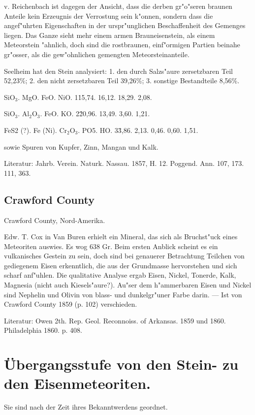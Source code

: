 \documentclass[a4paper, 11pt, oneside]{article}
\begin{document}
v. Reichenbach ist dagegen der Ansicht, dass die derben gr"o"seren braunen Anteile kein Erzeugnis der Verrostung sein k"onnen, sondern dass die angef"uhrten Eigenschaften in der urspr"unglichen Beschaffenheit des Gemenges liegen. Das Ganze sieht mehr einem armen Brauneisenstein, als einem Meteorstein "ahnlich, doch sind die rostbraunen, einf"ormigen Partien beinahe gr"osser, als die gew"ohnlichen gemengten Meteorsteinanteile.

Seelheim hat den Stein analysiert: 1. den durch Salzs"aure zersetzbaren Teil 52,23\%; 2. den nicht zersetzbaren Teil 39,26\%; 3. sonstige Bestandteile 8,56\%.

SiO$_{3}$. MgO. FeO. NiO.  
1\. 15,74. 16,12. 18,29. 2,08.

SiO$_{3}$. Al$_{2}$O$_{3}$. FeO. KO.  
2\. 20,96. 13,49. 3,60. 1,21.

FeS2 (?). Fe (Ni). Cr$_{2}$O$_{3}$. PO5. HO.  
3\. 3,86. 2,13. 0,46. 0,60. 1,51.

sowie Spuren von Kupfer, Zinn, Mangan und Kalk.

Literatur: Jahrb. Verein. Naturk. Nassau. 1857, H. 12. Poggend. Ann. 107, 173. 111, 363.

\subsection{Crawford County}

Crawford County, Nord-Amerika.

Edw. T. Cox in Van Buren erhielt ein Mineral, das sich als Bruchst"uck eines Meteoriten auswies. Es wog 638 Gr. Beim ersten Anblick scheint es ein vulkanisches Gestein zu sein, doch sind bei genauerer Betrachtung Teilchen von gediegenem Eisen erkenntlich, die aus der Grundmasse hervorstehen und sich scharf anf"uhlen. Die qualitative Analyse ergab Eisen, Nickel, Tonerde, Kalk, Magnesia (nicht auch Kiesels"aure?). Au"ser dem h"ammerbaren Eisen und Nickel sind Nephelin und Olivin von blass- und dunkelgr"uner Farbe darin. --- Ist von Crawford County 1859 (p. 102) verschieden.

Literatur: Owen 2th. Rep. Geol. Reconnoiss. of Arkansas. 1859 und 1860. Philadelphia 1860. p. 408.

\section{Übergangsstufe von den Stein- zu den Eisenmeteoriten.}

Sie sind nach der Zeit ihres Bekanntwerdens geordnet.
\end{document}
